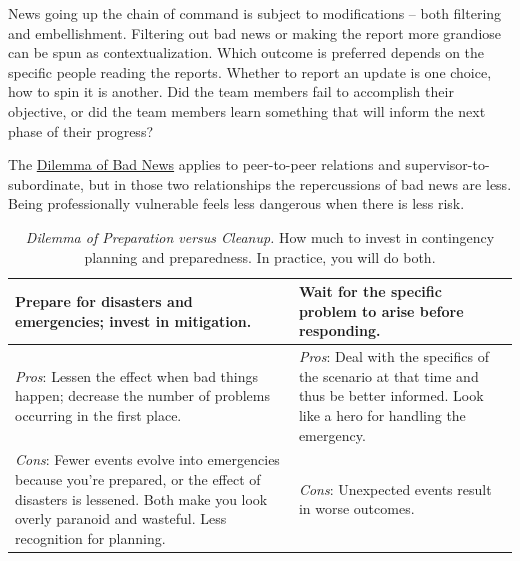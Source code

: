 News going up the chain of command is subject to modifications -- both filtering and embellishment. Filtering out bad news or making the report more grandiose can be spun as contextualization. Which outcome is preferred depends on the specific people reading the reports. Whether to report an update is one choice, how to spin it is another. Did the team members fail to accomplish their objective, or did the team members learn something that will inform the next phase of their progress?


The \hyperref[table:dilemma-personal-bad-news-up-the-chain]{Dilemma of Bad News} applies to peer-to-peer relations and supervisor-to-subordinate, but in those two relationships the repercussions of bad news are less. Being professionally vulnerable feels less dangerous when there is less risk. 


\begin{center}
\begin{table}[H] %
\begin{tabular}{ | m{\dilemmatablewidth}| m{\dilemmatablewidth} | } 
  \hline
  \textbf{Prepare for disasters and emergencies; invest in mitigation.} &
  \textbf{Wait for the specific problem to arise before responding.} \\
  \hline
  \textit{Pros}: Lessen the effect when bad things happen; decrease the number of problems  occurring in the first place. &
  \textit{Pros}: Deal with the specifics of the scenario at that time and thus be better informed. Look like a hero for handling the emergency. \\
  \hline
  \textit{Cons}: Fewer events evolve into emergencies because you're prepared, or the effect of disasters is lessened. Both make you look overly paranoid and wasteful. Less recognition for planning. & 
  \textit{Cons}: Unexpected events result in worse outcomes.  \\
  \hline
\end{tabular}
\caption{
\textit{Dilemma of Preparation versus Cleanup.} 
How much to invest in contingency planning and preparedness. In practice, you will do both.}
\label{table:dilemma-personal-emergencies-vs-ignore}
\end{table}
\end{center}

